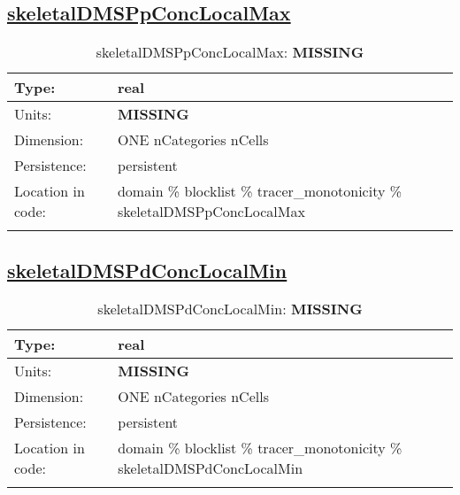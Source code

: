 \subsection[skeletalDMSPpConcLocalMax]{\hyperref[sec:var_tab_tracer_monotonicity]{skeletalDMSPpConcLocalMax}}
\label{subsec:var_sec_tracer_monotonicity_skeletalDMSPpConcLocalMax}
\begin{center}
\begin{longtable}{| p{2.0in} | p{4.0in} |}
        \hline 
        Type: & real \\
        \hline 
        Units: & {\bf \color{red} MISSING} \\
        \hline 
        Dimension: & ONE nCategories nCells \\
        \hline 
        Persistence: & persistent \\
        \hline 
         Location in code: & domain \% blocklist \% tracer\_monotonicity \% skeletalDMSPpConcLocalMax \\
         \hline 
    \caption{skeletalDMSPpConcLocalMax: {\bf \color{red} MISSING}}
\end{longtable}
\end{center}
\subsection[skeletalDMSPdConcLocalMin]{\hyperref[sec:var_tab_tracer_monotonicity]{skeletalDMSPdConcLocalMin}}
\label{subsec:var_sec_tracer_monotonicity_skeletalDMSPdConcLocalMin}
\begin{center}
\begin{longtable}{| p{2.0in} | p{4.0in} |}
        \hline 
        Type: & real \\
        \hline 
        Units: & {\bf \color{red} MISSING} \\
        \hline 
        Dimension: & ONE nCategories nCells \\
        \hline 
        Persistence: & persistent \\
        \hline 
         Location in code: & domain \% blocklist \% tracer\_monotonicity \% skeletalDMSPdConcLocalMin \\
         \hline 
    \caption{skeletalDMSPdConcLocalMin: {\bf \color{red} MISSING}}
\end{longtable}
\end{center}
